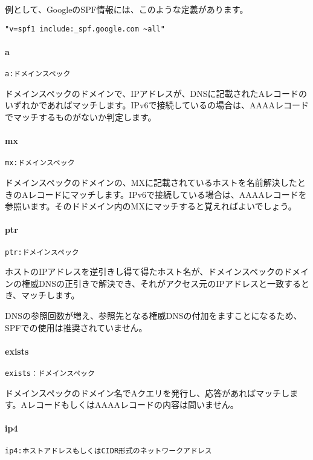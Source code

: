 例として、GoogleのSPF情報には、このような定義があります。

\begin{verbatim}
"v=spf1 include:_spf.google.com ~all"
\end{verbatim}

\paragraph{a}
\begin{verbatim}
a:ドメインスペック
\end{verbatim}
ドメインスペックのドメインで、IPアドレスが、DNSに記載されたAレコードのいずれかであればマッチします。IPv6で接続しているの場合は、AAAAレコードでマッチするものがないか判定します。

\paragraph{mx}
\begin{verbatim}
mx:ドメインスペック
\end{verbatim}
ドメインスペックのドメインの、MXに記載されているホストを名前解決したときのAレコードにマッチします。IPv6で接続している場合は、AAAAレコードを参照います。そのドドメイン内のMXにマッチすると覚えればよいでしょう。

\paragraph{ptr}
\begin{verbatim}
ptr:ドメインスペック
\end{verbatim}
ホストのIPアドレスを逆引きし得て得たホスト名が、ドメインスペックのドメインの権威DNSの正引きで解決でき、それがアクセス元のIPアドレスと一致するとき、マッチします。

DNSの参照回数が増え、参照先となる権威DNSの付加をますことになるため、SPFでの使用は推奨されていません。

\paragraph{exists}
\begin{verbatim}
exists：ドメインスペック
\end{verbatim}
ドメインスペックのドメイン名でAクエリを発行し、応答があればマッチします。AレコードもしくはAAAAレコードの内容は問いません。

\paragraph{ip4}
\begin{verbatim}
ip4:ホストアドレスもしくはCIDR形式のネットワークアドレス
\end{verbatim}

